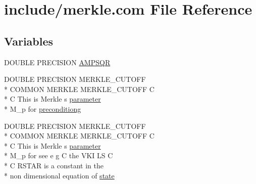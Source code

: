 \hypertarget{home_2abonfi_2_c_f_d__codes_2_eul_f_s_83_84_2include_2merkle_8com}{\section{include/merkle.com File Reference}
\label{home_2abonfi_2_c_f_d__codes_2_eul_f_s_83_84_2include_2merkle_8com}
}
\subsection*{Variables}
\begin{DoxyCompactItemize}
\item 
D\-O\-U\-B\-L\-E P\-R\-E\-C\-I\-S\-I\-O\-N \hyperlink{home_2abonfi_2_c_f_d__codes_2_eul_f_s_83_84_2include_2merkle_8com_a090e7861d41fe8b944374d3c9f7365bd}{A\-M\-P\-S\-Q\-R}
\item 
D\-O\-U\-B\-L\-E P\-R\-E\-C\-I\-S\-I\-O\-N M\-E\-R\-K\-L\-E\-\_\-\-C\-U\-T\-O\-F\-F \\*
C\-O\-M\-M\-O\-N M\-E\-R\-K\-L\-E M\-E\-R\-K\-L\-E\-\_\-\-C\-U\-T\-O\-F\-F C \\*
C This is Merkle s \hyperlink{msa20_2home_2abonfi_2_c_f_d__codes_2_eul_f_s_83_82_83_2include_2time_8com_ac7fc4dfa4b612e199fef035c5cf70be1}{parameter} \\*
M\-\_\-p for \hyperlink{home_2abonfi_2_c_f_d__codes_2_eul_f_s_83_84_2include_2merkle_8com_a0598863afc1fabc08a4d63618ed6d7d1}{preconditiong}
\item 
D\-O\-U\-B\-L\-E P\-R\-E\-C\-I\-S\-I\-O\-N M\-E\-R\-K\-L\-E\-\_\-\-C\-U\-T\-O\-F\-F \\*
C\-O\-M\-M\-O\-N M\-E\-R\-K\-L\-E M\-E\-R\-K\-L\-E\-\_\-\-C\-U\-T\-O\-F\-F C \\*
C This is Merkle s \hyperlink{msa20_2home_2abonfi_2_c_f_d__codes_2_eul_f_s_83_82_83_2include_2time_8com_ac7fc4dfa4b612e199fef035c5cf70be1}{parameter} \\*
M\-\_\-p for see e g C the V\-K\-I L\-S C \\*
C R\-S\-T\-A\-R is a constant in the \\*
non dimensional equation of \hyperlink{home_2abonfi_2_c_f_d__codes_2_eul_f_s_83_84_2include_2merkle_8com_a0ca46ab387e5b2d25720de7e533a6180}{state}
\end{DoxyCompactItemize}


